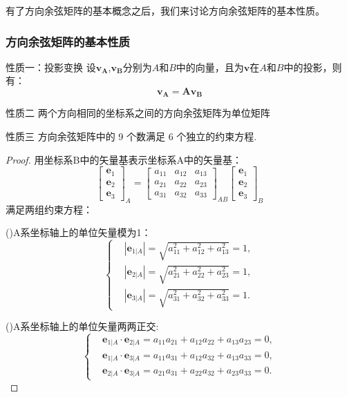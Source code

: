 有了方向余弦矩阵的基本概念之后，我们来讨论方向余弦矩阵的基本性质。
\subsubsection{方向余弦矩阵的基本性质}
\begin{myTheorem}{性质一：投影变换}
    设$\mathbf{v_A}$,$\mathbf{v_B}$分别为$A$和$B$中的向量，且为$\mathbf{v}$在$A$和$B$中的投影，则有：
$$\mathbf{v_A}=\boldsymbol{A}\mathbf{v_B}$$

\end{myTheorem}

\begin{myTheorem}{性质二}
    两个方向相同的坐标系之间的方向余弦矩阵为单位矩阵
\end{myTheorem}

\begin{myTheorem}{性质三}
    方向余弦矩阵中的 9 个数满足 6 个独立的约束方程.
\end{myTheorem}
\begin{proof}
    用坐标系B中的矢量基表示坐标系A中的矢量基：
     $$\begin{bmatrix}\boldsymbol{e}_{1}\\\boldsymbol{e}_{2}\\\boldsymbol{e}_{3}\end{bmatrix}_A=\begin{bmatrix}a_{11}&a_{12}&a_{13}\\a_{21}&a_{22}&a_{23}\\a_{31}&a_{32}&a_{33}\end{bmatrix}_{AB}\begin{bmatrix}\boldsymbol{e}_{1}\\\boldsymbol{e}_{2}\\\boldsymbol{e}_{3}\end{bmatrix}_B$$
     满足两组约束方程：

     (\uppercase\expandafter{})A系坐标轴上的单位矢量模为1：$$\begin{cases}&|\boldsymbol{e}_{1|A}|=\sqrt{a_{11}^2+a_{12}^2+a_{13}^2}=1,\\&|\boldsymbol{e}_{2|A}|=\sqrt{a_{21}^2+a_{22}^2+a_{23}^2}=1,\\&|\boldsymbol{e}_{3|A}|=\sqrt{a_{31}^2+a_{32}^2+a_{33}^2}=1.\end{cases}$$


     (\uppercase\expandafter{})A系坐标轴上的单位矢量两两正交:$$\begin{cases}&\boldsymbol{e}_{1|A}\cdot\boldsymbol{e}_{2|A}=a_{11}a_{21}+a_{12}a_{22}+a_{13}a_{23}=0,\\&\boldsymbol{e}_{1|A}\cdot\boldsymbol{e}_{3|A}=a_{11}a_{31}+a_{12}a_{32}+a_{13}a_{33}=0,\\&\boldsymbol{e}_{2|A}\cdot\boldsymbol{e}_{3|A}=a_{21}a_{31}+a_{22}a_{32}+a_{23}a_{33}=0.\end{cases}$$


\end{proof}

